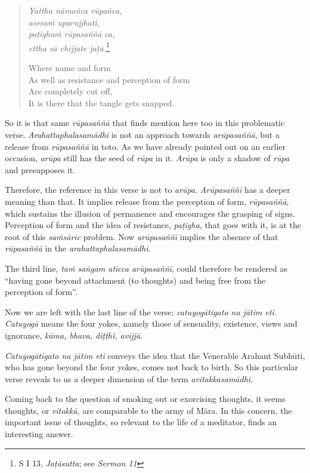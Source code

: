\begin{quote}
\emph{Yattha nāmañca rūpañca,}\\
\emph{asesaṁ uparujjhati,}\\
\emph{paṭighaṁ rūpasaññā ca,}\\
\emph{ettha sā chijjate jaṭā.}\footnote{S I 13, \emph{Jaṭāsutta}; see \emph{Sermon 11}}

Where name and form\\
As well as resistance and perception of form\\
Are completely cut off,\\
It is there that the tangle gets snapped.
\end{quote}

So it is that same \emph{rūpasaññā} that finds mention here too in this problematic verse. \emph{Arahattaphalasamādhi} is not an approach towards \emph{arūpasaññā}, but a release from \emph{rūpasaññā} in toto. As we have already pointed out on an earlier occasion, \emph{arūpa} still has the seed of \emph{rūpa} in it. \emph{Arūpa} is only a shadow of \emph{rūpa} and presupposes it.

Therefore, the reference in this verse is not to \emph{arūpa}. \emph{Arūpasaññī} has a deeper meaning than that. It implies release from the perception of form, \emph{rūpasaññā}, which sustains the illusion of permanence and encourages the grasping of signs. Perception of form and the idea of resistance, \emph{paṭigha}, that goes with it, is at the root of this \emph{saṁsāric} problem. Now \emph{arūpasaññī} implies the absence of that \emph{rūpasaññā} in the \emph{arahattaphalasamādhi}.

The third line, \emph{taṁ saṅgam aticca arūpasaññī}, could therefore be rendered as ``having gone beyond attachment (to thoughts) and being free from the perception of form''.

Now we are left with the last line of the verse: \emph{catuyogātigato na jātim eti.} \emph{Catuyogā} means the four yokes, namely those of sensuality, existence, views and ignorance, \emph{kāma, bhava, diṭṭhi, avijjā}.

\emph{Catuyogātigato na jātim eti} conveys the idea that the Venerable Arahant Subhūti, who has gone beyond the four yokes, comes not back to birth. So this particular verse reveals to us a deeper dimension of the term \emph{avitakkasamādhi}.

Coming back to the question of smoking out or exorcising thoughts, it seems thoughts, or \emph{vitakkā}, are comparable to the army of Māra. In this concern, the important issue of thoughts, so relevant to the life of a meditator, finds an interesting answer.

